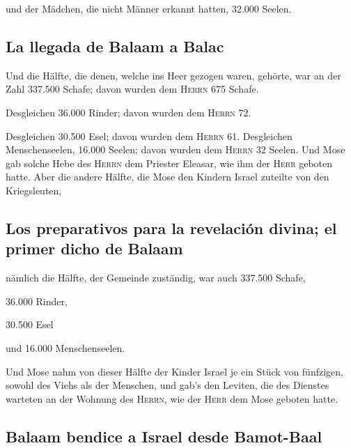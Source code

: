  und der Mädchen, die nicht Männer erkannt hatten, 32.000
Seelen.

\hypertarget{la-llegada-de-balaam-a-balac}{%
\subsection{La llegada de Balaam a
Balac}\label{la-llegada-de-balaam-a-balac}}

 Und die Hälfte, die denen, welche ins Heer gezogen
waren, gehörte, war an der Zahl 337.500 Schafe;  davon
wurden dem \textsc{Herrn} 675 Schafe.

 Desgleichen 36.000 Rinder; davon wurden dem
\textsc{Herrn} 72.

 Desgleichen 30.500 Esel; davon wurden dem \textsc{Herrn}
61.  Desgleichen Menschenseelen, 16.000 Seelen; davon
wurden dem \textsc{Herrn} 32 Seelen.  Und Mose gab solche
Hebe des \textsc{Herrn} dem Priester Eleasar, wie ihm der \textsc{Herr}
geboten hatte.  Aber die andere Hälfte, die Mose den
Kindern Israel zuteilte von den Kriegsleuten,

\hypertarget{los-preparativos-para-la-revelaciuxf3n-divina-el-primer-dicho-de-balaam}{%
\subsection{Los preparativos para la revelación divina; el primer dicho
de
Balaam}\label{los-preparativos-para-la-revelaciuxf3n-divina-el-primer-dicho-de-balaam}}

 nämlich die Hälfte, der Gemeinde zuständig, war auch
337.500 Schafe,

 36.000 Rinder,

 30.500 Esel

 und 16.000 Menschenseelen.

 Und Mose nahm von dieser Hälfte der Kinder Israel je ein
Stück von fünfzigen, sowohl des Viehs als der Menschen, und gab's den
Leviten, die des Dienstes warteten an der Wohnung des \textsc{Herrn},
wie der \textsc{Herr} dem Mose geboten hatte.

\hypertarget{balaam-bendice-a-israel-desde-bamot-baal}{%
\subsection{Balaam bendice a Israel desde
Bamot-Baal}\label{balaam-bendice-a-israel-desde-bamot-baal}}

